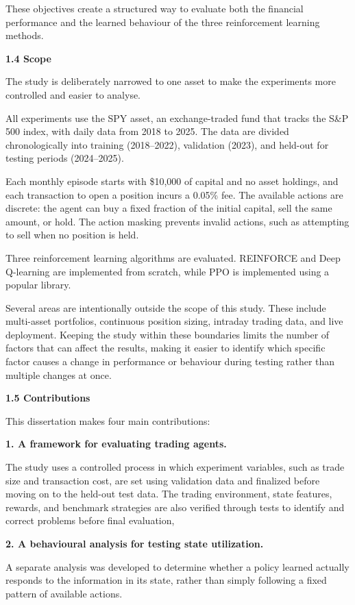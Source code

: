 These objectives create a structured way to evaluate both the financial
performance and the learned behaviour of the three reinforcement
learning methods.

\textbf{1.4 Scope}

The study is deliberately narrowed to one asset to make the experiments
more controlled and easier to analyse.

All experiments use the SPY asset, an exchange-traded fund that tracks
the S\&P 500 index, with daily data from 2018 to 2025. The data are
divided chronologically into training (2018--2022), validation (2023),
and held-out for testing periods (2024--2025).

Each monthly episode starts with \$10,000 of capital and no asset
holdings, and each transaction to open a position incurs a 0.05\% fee.
The available actions are discrete: the agent can buy a fixed fraction
of the initial capital, sell the same amount, or hold. The action
masking prevents invalid actions, such as attempting to sell when no
position is held.

Three reinforcement learning algorithms are evaluated. REINFORCE and
Deep Q-learning are implemented from scratch, while PPO is implemented
using a popular library.

Several areas are intentionally outside the scope of this study. These
include multi-asset portfolios, continuous position sizing, intraday
trading data, and live deployment. Keeping the study within these
boundaries limits the number of factors that can affect the results,
making it easier to identify which specific factor causes a change in
performance or behaviour during testing rather than multiple changes at
once.

\textbf{1.5 Contributions}

This dissertation makes four main contributions:

\textbf{1. A framework for evaluating trading agents.}

The study uses a controlled process in which experiment variables, such
as trade size and transaction cost, are set using validation data and
finalized before moving on to the held-out test data. The trading
environment, state features, rewards, and benchmark strategies are also
verified through tests to identify and correct problems before final
evaluation,

\textbf{2. A behavioural analysis for testing state utilization.}

A separate analysis was developed to determine whether a policy learned
actually responds to the information in its state, rather than simply
following a fixed pattern of available actions.

